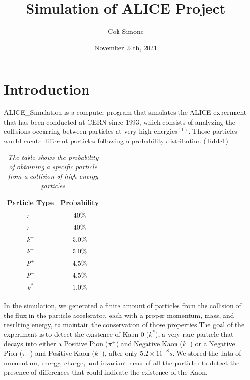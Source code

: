 \documentclass[a4paper, 11pt]{article}
\begin{document}
  \title{Simulation of ALICE Project}
  \author{Coli Simone}
  \date{November 24th, 2021}
  \maketitle
  \section{Introduction}

  ALICE\_Simulation is a computer program that simulates the ALICE experiment that has been conducted at CERN since 1993, which consists of analyzing the collisions occurring between particles at very high energies$^{(1)}$. Those particles would create different particles following a probability distribution (Table\ref{table1}).\\
    \begin{table}[h!]
      \centering
      \begin{tabular}{ c c }
        \hline
        Particle Type & Probability \\
        \hline
        $\pi^+$ & $40\%$ \\
        $\pi^-$ & $40\%$ \\
        $k^+$ & $5.0\%$\\
        $k^-$ & $5.0\%$\\
        $P^+$ & $4.5\%$\\
        $P^-$ & $4.5\%$\\
        $k^*$ & $1.0\%$\\
        \hline
      \end{tabular}
      \caption{ \label{table1}
      \textit{The table shows the probability of obtaining a specific particle from a collision of high energy particles}
      }
    \end{table}

    In the simulation, we generated a finite amount of particles from the collision of the flux in the particle accelerator, each with a proper momentum, mass, and resulting energy, to maintain the conservation of those properties.The goal of the experiment is to detect the existence of Kaon 0 ($k^*$), a very rare particle that decays into either a Positive Pion ($\pi^+$) and Negative Kaon ($k^-$) or a Negative Pion ($\pi^-$) and Positive Kaon ($k^+$), after only $5.2 \times 10^{-8}s$. We stored the data of momentum, energy, charge, and invariant mass of all the particles to detect the presence of differences that could indicate the existence of the Kaon.
\end{document}
